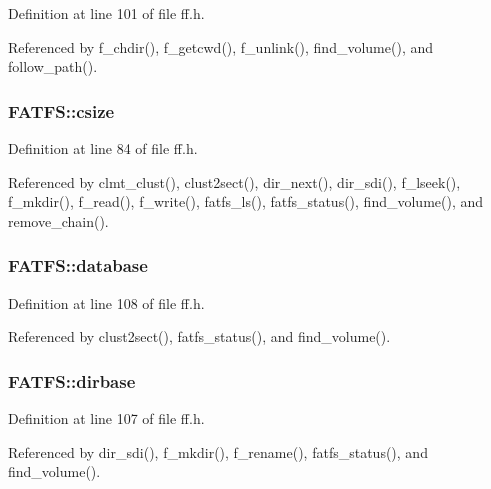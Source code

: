 Definition at line 101 of file ff.\-h.



Referenced by f\-\_\-chdir(), f\-\_\-getcwd(), f\-\_\-unlink(), find\-\_\-volume(), and follow\-\_\-path().

\hypertarget{structFATFS_a504a1175f6dcc9a854b9da94463bd108}{
\subsubsection[{csize}]{ F\-A\-T\-F\-S\-::csize}}\label{structFATFS_a504a1175f6dcc9a854b9da94463bd108}


Definition at line 84 of file ff.\-h.



Referenced by clmt\-\_\-clust(), clust2sect(), dir\-\_\-next(), dir\-\_\-sdi(), f\-\_\-lseek(), f\-\_\-mkdir(), f\-\_\-read(), f\-\_\-write(), fatfs\-\_\-ls(), fatfs\-\_\-status(), find\-\_\-volume(), and remove\-\_\-chain().

\hypertarget{structFATFS_a5b6c0bc2e9fd2ae8ef714210a74a2d5d}{
\subsubsection[{database}]{ F\-A\-T\-F\-S\-::database}}\label{structFATFS_a5b6c0bc2e9fd2ae8ef714210a74a2d5d}


Definition at line 108 of file ff.\-h.



Referenced by clust2sect(), fatfs\-\_\-status(), and find\-\_\-volume().

\hypertarget{structFATFS_a3f72fd998dbcce4652a85a81fe944bc4}{
\subsubsection[{dirbase}]{ F\-A\-T\-F\-S\-::dirbase}}\label{structFATFS_a3f72fd998dbcce4652a85a81fe944bc4}


Definition at line 107 of file ff.\-h.



Referenced by dir\-\_\-sdi(), f\-\_\-mkdir(), f\-\_\-rename(), fatfs\-\_\-status(), and find\-\_\-volume().

